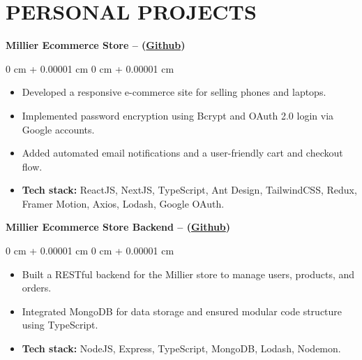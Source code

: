\documentclass[10pt, letterpaper]{article}
\newenvironment{highlights}{
    \begin{itemize}[
        topsep=0.10 cm,
        parsep=0.10 cm,
        partopsep=0pt,
        itemsep=0pt,
        leftmargin=0 cm + 10pt
    ]
}{
    \end{itemize}
} %
\newenvironment{onecolentry}{
    \begin{adjustwidth}{
        0 cm + 0.00001 cm
    }{
        0 cm + 0.00001 cm
    }
}{
    \end{adjustwidth}
} %
\begin{document}
    \section{PERSONAL PROJECTS}       
    
    \vspace{0.20 cm}
    \textbf{Millier Ecommerce Store – (\href{https://github.com/holimm/millierstore}{Github})}
    \vspace{0.10 cm}
    \begin{onecolentry}
        \begin{highlights}
            \item Developed a responsive e-commerce site for selling phones and laptops.
            \item Implemented password encryption using Bcrypt and OAuth 2.0 login via Google accounts.
            \item Added automated email notifications and a user-friendly cart and checkout flow.
            \item {\bf Tech stack:} ReactJS, NextJS, TypeScript, Ant Design, TailwindCSS, Redux, Framer Motion, Axios, Lodash, Google OAuth.
        \end{highlights}
    \end{onecolentry}
    \vspace{0.20 cm}
    \textbf{Millier Ecommerce Store Backend – (\href{https://github.com/holimm/MillierBE}{Github})}
    \vspace{0.10 cm}
    \begin{onecolentry}
        \begin{highlights}
            \item Built a RESTful backend for the Millier store to manage users, products, and orders.
            \item Integrated MongoDB for data storage and ensured modular code structure using TypeScript.
            \item {\bf Tech stack:} NodeJS, Express, TypeScript, MongoDB, Lodash, Nodemon.
        \end{highlights}
    \end{onecolentry}
\end{document}
